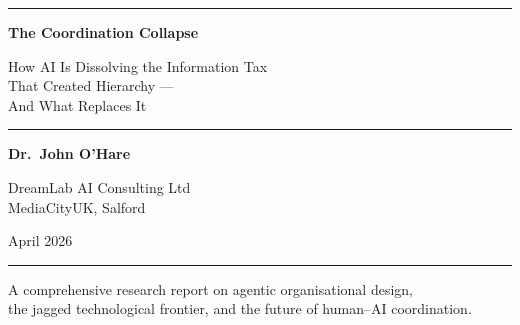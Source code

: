 \documentclass[12pt,a4paper,openright]{report}
\begin{document}
\begin{titlepage}
\begin{center}

\vspace*{2cm}

{\color{accentgold}\rule{\textwidth}{2pt}}

\vspace{1.5cm}

{\fontsize{28}{34}\selectfont\bfseries\color{navyblue}
The Coordination Collapse}

\vspace{0.8cm}

{\fontsize{16}{20}\selectfont\color{navyblue!80!black}
How AI Is Dissolving the Information Tax\\
That Created Hierarchy ---\\
And What Replaces It}

\vspace{1.2cm}

{\color{accentgold}\rule{0.4\textwidth}{1pt}}

\vspace{1.2cm}

{\Large\bfseries Dr.\ John O'Hare}

\vspace{0.4cm}

{\large\color{navyblue!70!black}
DreamLab AI Consulting Ltd\\
MediaCityUK, Salford}

\vspace{1.5cm}

{\large April 2026}

\vspace{2cm}

{\color{accentgold}\rule{\textwidth}{2pt}}

\vfill

{\small\color{navyblue!50!black}
A comprehensive research report on agentic organisational design,\\
the jagged technological frontier, and the future of human--AI coordination.}

\end{center}
\end{titlepage}

\frontmatter
\pagestyle{plain}

\tableofcontents
\listoffigures
\listoftables
\end{document}
